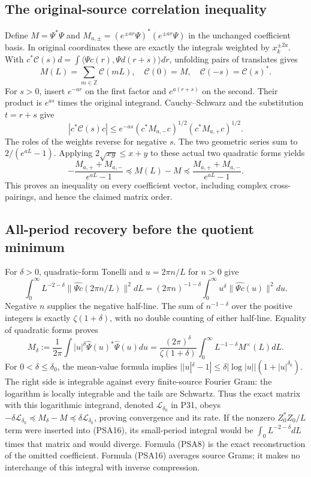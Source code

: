 \documentclass{article}
\begin{document}
\subsection{The original-source correlation inequality}

Define $M=\Psi^*\Psi$ and
$M_{a,\pm}=(e^{\pm ar}\Psi)^*(e^{\pm ar}\Psi)$ in the unchanged
coefficient basis. In original coordinates these are exactly the
integrals weighted by $x_k^{\pm2a}$. With
$c^*\mathcal C(s)d=\int\langle\Psi c(r),\Psi d(r+s)\rangle dr$,
unfolding pairs of translates gives
\[
 M(L)=\sum_{m\in\mathbb Z}\mathcal C(mL),\quad
 \mathcal C(0)=M,\quad\mathcal C(-s)=\mathcal C(s)^*.
 \tag{PSA12}
\]
For $s>0$, insert $e^{-ar}$ on the first factor and $e^{a(r+s)}$
on the second. Their product is $e^{as}$ times the original integrand.
Cauchy--Schwarz and the substitution $t=r+s$ give
\[
 |c^*\mathcal C(s)c|
 \le e^{-as}(c^*M_{a,-}c)^{1/2}(c^*M_{a,+}c)^{1/2}.
 \tag{PSA13}
\]
The roles of the weights reverse for negative $s$. The two geometric
series sum to $2/(e^{aL}-1)$. Applying
$2\sqrt{xy}\le x+y$ to these actual two quadratic forms yields
\[
 -\frac{M_{a,+}+M_{a,-}}{e^{aL}-1}
 \preceq M(L)-M\preceq
 \frac{M_{a,+}+M_{a,-}}{e^{aL}-1}.
 \tag{PSA14}
\]
This proves an inequality on every coefficient vector, including
complex cross-pairings, and hence the claimed matrix order.

\subsection{All-period recovery before the quotient minimum}

For $\delta>0$, quadratic-form Tonelli and
$u=2\pi n/L$ for $n>0$ give
\[
 \int_0^\infty L^{-2-\delta}
       \|\widehat{\Psi c}(2\pi n/L)\|^2dL
 =(2\pi n)^{-1-\delta}\int_0^\infty
       u^\delta\|\widehat{\Psi c}(u)\|^2du.
 \tag{PSA15}
\]
Negative $n$ supplies the negative half-line. The sum of
$n^{-1-\delta}$ over the positive integers is exactly
$\zeta(1+\delta)$, with no double counting of either half-line.
Equality of quadratic forms proves
\[
 M_\delta:=\frac1{2\pi}\int|u|^\delta
       \widehat\Psi(u)^*\widehat\Psi(u)du
 =\frac{(2\pi)^\delta}{\zeta(1+\delta)}
       \int_0^\infty L^{-1-\delta}M^\times(L)dL.
 \tag{PSA16}
\]
For $0<\delta\le\delta_0$, the mean-value formula implies
$||u|^\delta-1|\le\delta|\log|u||
(1+|u|^{\delta_0})$. The right side is integrable against every
finite-source Fourier Gram: the logarithm is locally integrable and
the tails are Schwartz. Thus the exact matrix with this logarithmic
integrand, denoted $\mathcal L_{\delta_0}$ in P31, obeys
$-\delta\mathcal L_{\delta_0}\preceq M_\delta-M
\preceq\delta\mathcal L_{\delta_0}$, proving convergence and its rate.
If the nonzero $Z_0^*Z_0/L$ term were inserted into (PSA16), its
small-period integral would be $\int_0 L^{-2-\delta}dL$ times that
matrix and would diverge. Formula (PSA8) is the exact reconstruction
of the omitted coefficient. Formula (PSA16) averages source Grams;
it makes no interchange of this integral with inverse compression.
\end{document}
